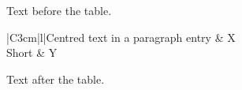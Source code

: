\documentclass[12pt]{article}
\begin{document}
Text before the table.

\begin{tabular}{|C{3cm}|l|}\hline Centred text in a paragraph entry & X\\\hline Short & Y\\\hline\end{tabular}

Text after the table.
\end{document}
